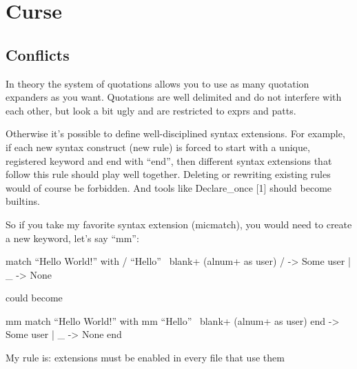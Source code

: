 
\section{Curse}

\subsection{Conflicts}
In theory the system of quotations allows you to use as many quotation
expanders as you want. Quotations are well delimited and do not
interfere with each other, but look a bit ugly and are restricted to
exprs and patts.

Otherwise it's possible to define well-disciplined syntax extensions.
For example, if each new syntax construct (new rule) is forced to
start with a unique, registered keyword and end with ``end'', then
different syntax extensions that follow this rule should play well
together. Deleting or rewriting existing rules would of course be
forbidden.
And tools like Declare_once [1] should become builtins.

So if you take my favorite syntax extension (micmatch), you would need
to create a new keyword, let's say ``mm'':


\begin{ocamlcode}
  match ``Hello World!'' with
      / ``Hello''~ blank+ (alnum+ as user) / -> Some user
    | _ -> None
\end{ocamlcode}
could become
\begin{ocamlcode}
  mm match ``Hello World!'' with
     mm ``Hello''~ blank+ (alnum+ as user) end -> Some user
   | _ -> None
  end
\end{ocamlcode}

My rule is: extensions must be enabled in every file that
use them




